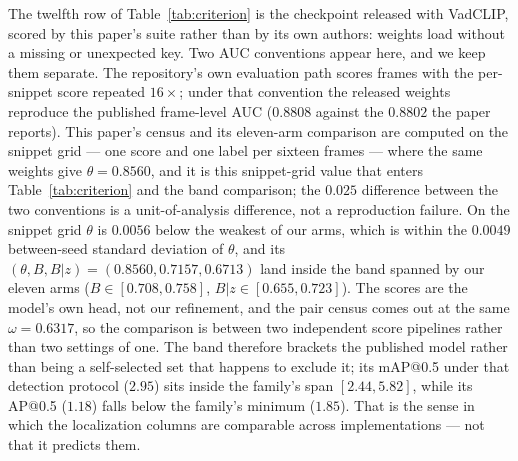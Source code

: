 \documentclass[number,preprint,12pt]{elsarticle}
\begin{document}
The twelfth row of Table~\ref{tab:criterion} is the checkpoint released with
VadCLIP, scored by this paper's suite rather than by its own authors: weights
load without a missing or unexpected key. Two AUC conventions appear here, and
we keep them separate. The repository's own evaluation path scores frames with
the per-snippet score repeated \(16\times\); under that convention the released
weights reproduce the published frame-level AUC (\(0.8808\) against the \(0.8802\)
the paper reports). This paper's census and its eleven-arm comparison are
computed on the snippet grid --- one score and one label per sixteen frames ---
where the same weights give \(\theta=0.8560\), and it is this snippet-grid value
that enters Table~\ref{tab:criterion} and the band comparison; the \(0.025\)
difference between the two conventions is a unit-of-analysis difference, not a
reproduction failure. On the snippet grid \(\theta\) is \(0.0056\)
below the weakest of our arms, which is within the \(0.0049\) between-seed
standard deviation of \(\theta\), and its
\((\theta,B,B|z)=(0.8560,0.7157,0.6713)\) land inside the band spanned by our
eleven arms (\(B\in[0.708,0.758]\), \(B|z\in[0.655,0.723]\)). The scores are the model's own head, not our
refinement, and the pair census comes out at the same \(\omega=0.6317\), so the
comparison is between two independent score pipelines rather than two settings
of one. The band therefore brackets the published model
rather than being a self-selected set that happens to exclude it; its mAP@0.5
under that detection protocol (\(2.95\)) sits inside the family's span
\([2.44,5.82]\), while its AP@0.5 (\(1.18\)) falls below the family's minimum
(\(1.85\)). That is the sense in which the localization columns
are comparable across implementations --- not that it predicts them.





\end{document}

